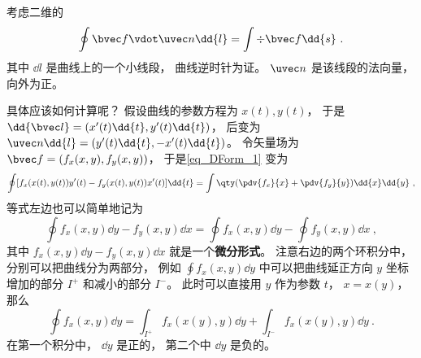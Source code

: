
\begin{issues}
\issueDraft
{}
\end{issues}


考虑二维的
\begin{equation}\label{eq_DForm_1}
\oint \bvec f \vdot \uvec n \dd{l} = \int \div \bvec f \dd{s}~.
\end{equation}
其中 $\dd{l}$ 是曲线上的一个小线段， 曲线逆时针为证。 $\uvec n$ 是该线段的法向量， 向外为正。

具体应该如何计算呢？ 假设曲线的参数方程为 $x(t), y(t)$， 于是 $\dd{\bvec l} = (x'(t)\dd{t}, y'(t)\dd{t})$， 后变为 $\uvec n \dd{l} = (y'(t)\dd{t}, -x'(t)\dd{t})$。 令矢量场为 $\bvec f = (f_x(x,y), f_y(x,y))$， 于是\autoref{eq_DForm_1} 变为
\begin{equation}
\oint [f_x(x(t),y(t)) y'(t) - f_y(x(t),y(t)) x'(t)]\dd{t}
= \int \qty(\pdv{f_x}{x} + \pdv{f_y}{y}) \dd{x}\dd{y}~,
\end{equation}
等式左边也可以简单地记为
\begin{equation}
\oint f_x(x,y) \dd{y} - f_y(x,y) \dd{x} = \oint f_x(x,y) \dd{y} - \oint f_y(x,y) \dd{x}~,
\end{equation}
其中 $f_x(x,y) \dd{y} - f_y(x,y) \dd{x}$ 就是一个\textbf{微分形式}。 注意右边的两个环积分中， 分别可以把曲线分为两部分， 例如 $\oint f_x(x,y) \dd{y}$ 中可以把曲线延正方向 $y$ 坐标增加的部分 $I^+$ 和减小的部分 $I^-$。 此时可以直接用 $y$ 作为参数 $t$， $x = x(y)$， 那么
\begin{equation}
\oint f_x(x,y) \dd{y} = \int_{I^+} f_x(x(y),y) \dd{y} + \int_{I^-} f_x(x(y),y) \dd{y}~.
\end{equation}
在第一个积分中， $\dd{y}$ 是正的， 第二个中 $\dd{y}$ 是负的。

